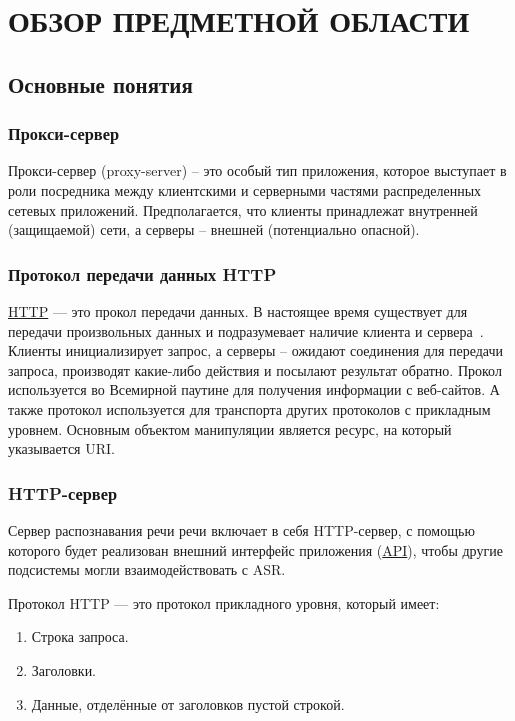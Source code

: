 
\chapter{ОБЗОР ПРЕДМЕТНОЙ ОБЛАСТИ}

\section{Основные понятия}

\subsection{Прокси-сервер}
Прокси-сервер (proxy-server) – это особый тип приложения, которое
выступает в роли посредника между клиентскими и серверными частями
распределенных сетевых приложений. Предполагается, что клиенты принадлежат
внутренней (защищаемой) сети, а серверы – внешней (потенциально опасной).

\subsection{Протокол передачи данных HTTP}
\hyperlink{http}{HTTP} --- это прокол передачи данных. В настоящее время существует для передачи
произвольных данных и подразумевает наличие клиента и сервера~\cite{http}.
Клиенты инициализирует запрос, а серверы – ожидают соединения для передачи
запроса, производят какие-либо действия и посылают результат обратно. Прокол
используется во Всемирной паутине для получения информации с веб-сайтов. А
также протокол используется для транспорта других протоколов с прикладным
уровнем. Основным объектом манипуляции является ресурс, на который указывается URI.

\subsection{HTTP-сервер}
Сервер распознавания речи речи включает в себя HTTP-сервер, с помощью которого
будет реализован внешний интерфейс приложения (\hyperlink{api}{API}), чтобы другие
подсистемы могли взаимодействовать с ASR.

Протокол HTTP --- это протокол прикладного уровня, который имеет:
\begin{enumerate}
    \item Строка запроса.
    \item Заголовки.
    \item Данные, отделённые от заголовков пустой строкой.
\end{enumerate}


